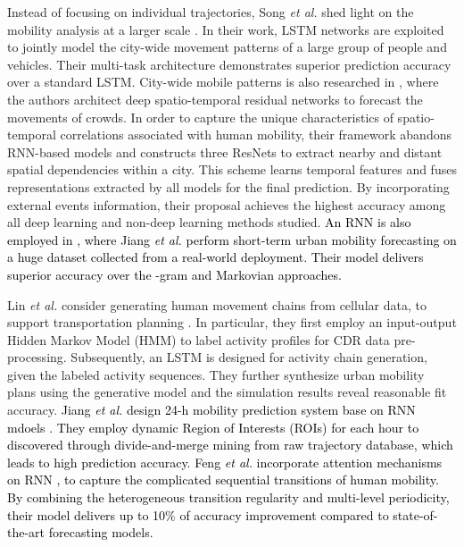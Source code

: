 \documentclass[journal,comsoc,letter]{IEEEtran}
\newcommand{\edit}[1]{\textcolor{black}{#1}}
\newcommand{\rev}[1]{\textcolor{black}{#1}}
\begin{document}
Instead of focusing on individual trajectories, Song \emph{et al.} shed light on the mobility analysis at a larger scale \cite{song2016deeptransport}. In their work, LSTM networks are exploited to jointly model the city-wide movement patterns of a large group of people and vehicles. Their multi-task architecture demonstrates superior prediction accuracy over a standard LSTM. City-wide mobile patterns is also researched in \cite{zhang2017deep123}, where the authors architect deep spatio-temporal residual networks to forecast the movements of crowds. In order to capture the unique characteristics of spatio-temporal correlations associated with human mobility, their framework abandons RNN-based models and constructs three ResNets to extract nearby and distant spatial dependencies within a city. This scheme learns temporal features and fuses representations extracted by all models for the final prediction. By incorporating external events information, their proposal achieves the highest accuracy among all deep learning and non-deep learning methods studied. \rev{An RNN is also employed in \cite{jiang2018deepurbanmomentum}, where Jiang \emph{et al.} perform short-term urban mobility forecasting on a huge dataset collected from a real-world deployment. Their model delivers superior accuracy over the -gram and Markovian approaches.}

Lin \emph{et al.} consider generating human movement chains from cellular data, to support transportation planning \cite{lin2017deep}. In particular, they first employ an input-output Hidden Markov Model (HMM) to label activity profiles for CDR data pre-processing. Subsequently, an LSTM is designed for activity chain generation, given the labeled activity sequences. They further synthesize urban mobility plans using the generative model and the simulation results reveal reasonable fit accuracy. \edit{Jiang \emph{et al.} design 24-h mobility prediction system base on RNN mdoels \cite{jiang2018deep}. They employ dynamic Region of Interests (ROIs) for each hour to discovered through divide-and-merge mining from raw trajectory database, which leads to high prediction accuracy. Feng \emph{et al.} incorporate attention mechanisms on RNN \cite{feng2018deepmove}, to capture the complicated sequential transitions of human mobility. By combining the heterogeneous transition regularity and multi-level periodicity, their model delivers up to 10\% of accuracy improvement compared to state-of-the-art forecasting models.}
\end{document}
